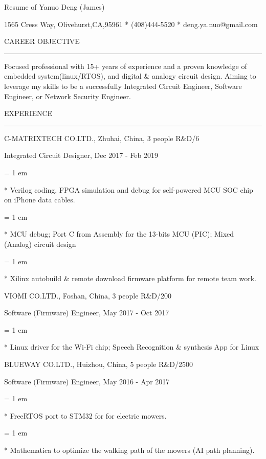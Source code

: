 

\centerline{ \FFbg
Resume of Yanuo Deng (James)
}

\centerline{ %
1565 Cress Way, Olivehurst,CA,95961
*
(408)444-5520
*
deng.ya.nuo@gmail.com
}

{ \medbreak } { \FFbg
CAREER OBJECTIVE
}

{ \smallbreak } {\par\noindent\hrule} { \smallbreak }

    Focused professional with 15+ years of experience
and a proven knowledge of embedded system(linux/RTOS),
and digital \& analogy circuit design.
    Aiming to leverage my skills to be a successfully
Integrated Circuit Engineer,
Software Engineer,
or Network Security Engineer.

{ \medbreak } { \FFbg
EXPERIENCE
}
{ \smallbreak } {\par\noindent\hrule} { \smallbreak }

{ \medbreak } { \FFbg
C-MATRIXTECH CO.LTD., Zhuhai, China, 3 people R\&D/6
}

{ \FFte
Integrated Circuit Designer, Dec 2017 - Feb 2019
}

{ \parindent = 1 em \item{*}
 Verilog coding, FPGA simulation and debug for self-powered MCU SOC chip on iPhone data cables.
}

{ \parindent = 1 em \item{*}
 MCU debug; Port C from Assembly for the 13-bits MCU (PIC); Mixed (Analog) circuit design
}
{ \parindent = 1 em \item{*}
 Xilinx autobuild \& remote download firmware platform for remote team work.
}

{ \medbreak } { \FFbg
VIOMI CO.LTD., Foshan, China, 3 people R\&D/200
}

{ \FFte
Software (Firmware) Engineer, May 2017 - Oct 2017
}

{ \parindent = 1 em \item{*}
 Linux driver for the Wi-Fi chip; Speech Recognition 
 \&
 synthesis
 App for Linux
 }

{ \medbreak } { \FFbg
BLUEWAY CO.LTD., Huizhou, China, 5 people R\&D/2500
}

{ \FFte
Software (Firmware) Engineer, May 2016 - Apr 2017
}
{ \parindent = 1 em \item{*}
 FreeRTOS port to STM32 for for electric mowers.
}
{ \parindent = 1 em \item{*}
Mathematica to optimize the walking path of the mowers (AI path planning).
}

